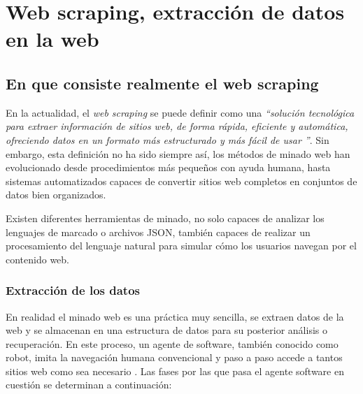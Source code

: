 \chapter{Web scraping, extracción de datos en la web}
\label{cha:web scraping, extraccion de datos en la web}

\section{En que consiste realmente el web scraping}
\label{sec:en que consiste realmente el web scraping}

En la actualidad, el \emph{web scraping} se puede definir como una \emph{“solución tecnológica para extraer
información de sitios web, de forma rápida, eficiente y automática, ofreciendo datos en un formato más
estructurado y más fácil de usar \cite{web-scraping-osmar-castrillo}”}. Sin embargo, esta definición no ha
sido siempre así, los métodos de minado web han evolucionado desde procedimientos más pequeños con ayuda
humana, hasta sistemas automatizados capaces de convertir sitios web completos en conjuntos de datos bien
organizados.

Existen diferentes herramientas de minado, no solo capaces de analizar los lenguajes de marcado o archivos 
JSON, también capaces de realizar un procesamiento del lenguaje natural para simular cómo los usuarios 
navegan por el contenido web.

\subsection{Extracción de los datos}
\label{subsec:extraccion de los datos}

En realidad el minado web es una práctica muy sencilla, se extraen datos de la web y se almacenan en una
estructura de datos para su posterior análisis o recuperación. En este proceso, un agente de software,
también conocido como robot, imita la navegación humana convencional y paso a paso accede a tantos sitios
web como sea necesario \cite{web-scraping-api-world}. Las fases por las que pasa el agente software en
cuestión se determinan a continuación:

